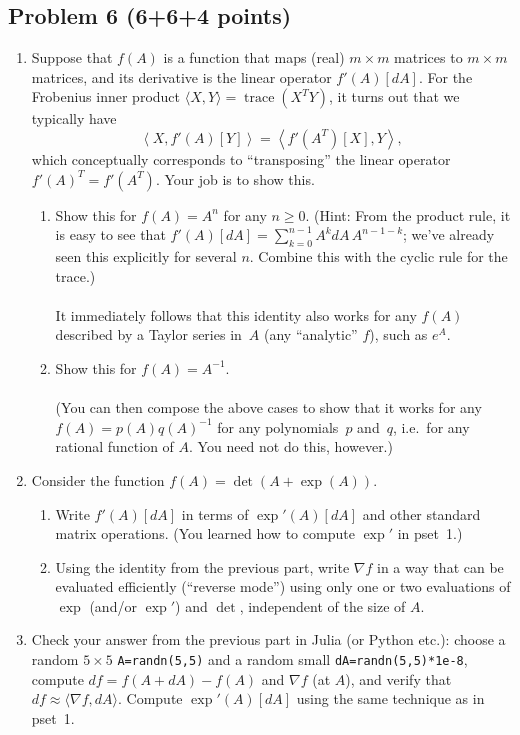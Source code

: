 \documentclass[10pt,oneside]{article}
\newcommand{\tr}{\operatorname{trace}}
\begin{document}
\subsection*{Problem 6 (6+6+4 points)}
\begin{enumerate}
\item Suppose that $f(A)$ is a function that maps (real) $m\times m$ matrices
to $m\times m$ matrices, and its derivative is the linear operator
$f'(A)[dA]$. For the Frobenius inner product $\langle X,Y\rangle=\tr(X^{T}Y)$,
it turns out that we typically have 
\[
\left\langle X,f'(A)[Y]\right\rangle =\left\langle f'(A^{T})[X],Y\right\rangle ,
\]
which conceptually corresponds to “transposing” the linear operator
$f'(A)^{T}=f'(A^{T})$. Your job is to show this.
\begin{enumerate}
\item Show this for $f(A)=A^{n}$ for any $n\ge0$. (Hint: From the product
rule, it is easy to see that $f'(A)[dA]=\sum_{k=0}^{n-1}A^{k}dA\,A^{n-1-k}$;
we've already seen this explicitly for several $n$. Combine this
with the cyclic rule for the trace.)\\
\\
It immediately follows that this identity also works for any $f(A)$
described by a Taylor series in~$A$ (any ``analytic'' $f$), such
as $e^{A}$.
\item Show this for $f(A)=A^{-1}$.\\
\\
(You can then compose the above cases to show that it works for any
$f(A)=p(A)q(A)^{-1}$ for any polynomials~$p$ and~$q$, i.e.~for
any rational function of $A$. You need not do this, however.)
\end{enumerate}
\item Consider the function $f(A)=\det(A + \exp(A))$.
\begin{enumerate}
\item Write $f'(A)[dA]$ in terms of $\exp'(A)[dA]$ and other standard matrix operations. (You learned how to
compute $\exp'$ in pset~1.)
\item Using the identity from the previous part, write $\nabla f$ in a
way that can be evaluated efficiently (``reverse mode'') using
only one or two evaluations of $\exp$ (and/or $\exp'$) and $\det$,
independent of the size of $A$.
\end{enumerate}
\item Check your answer from the previous part in Julia (or Python etc.):
choose a random $5\times5$ \texttt{A=randn(5,5)} and a random small
\texttt{dA=randn(5,5){*}1e-8}, compute $df=f(A+dA)-f(A)$ and $\nabla f$
(at $A$), and verify that $df\approx\langle\nabla f,dA\rangle$.
Compute $\exp'(A)[dA]$ using the same technique as in pset~1.
\end{enumerate}
\end{document}
